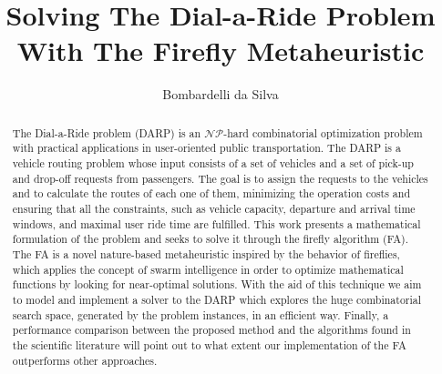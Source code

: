 \documentclass[tuberlin,cic,tc,openright,english,noabntcite,oneside]{iiufrgs}
\title{Solving The Dial-a-Ride Problem With The Firefly Metaheuristic}
\author{Bombardelli da Silva}{Fernando}
\begin{document}
\maketitle





\begin{abstract}
The Dial-a-Ride problem (DARP) is an $\mathcal{NP}$-hard combinatorial optimization problem with practical applications in user-oriented public transportation. The DARP is a vehicle routing problem whose input consists of a set of vehicles and a set of pick-up and drop-off requests from passengers. The goal is to assign the requests to the vehicles and to calculate the routes of each one of them, minimizing the operation costs and ensuring that all the constraints, such as vehicle capacity, departure and arrival time windows, and maximal user ride time are fulfilled. This work presents a mathematical formulation of the problem and seeks to solve it through the firefly algorithm (FA). The FA is a novel nature-based metaheuristic inspired by the behavior of fireflies, which applies the concept of swarm intelligence in order to optimize mathematical functions by looking for near-optimal solutions. With the aid of this technique we aim to model and implement a solver to the DARP which explores the huge combinatorial search space, generated by the problem instances, in an efficient way. Finally, a performance comparison between the proposed method and the algorithms found in the scientific literature will point out to what extent our implementation of the FA outperforms other approaches.
\end{abstract}
\end{document}
